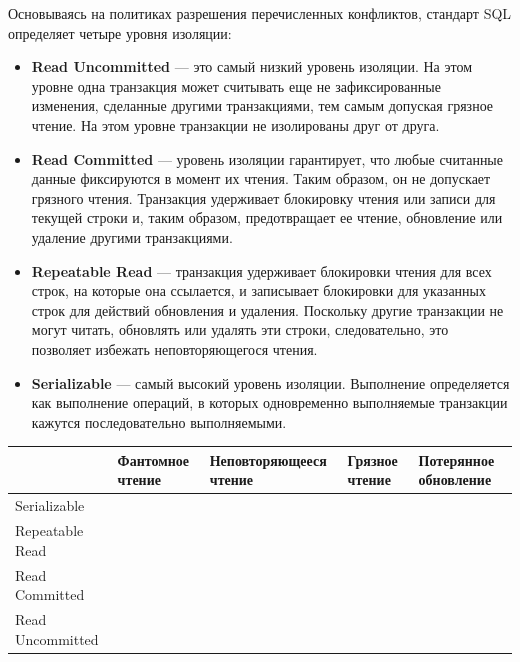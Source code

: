 Основываясь на политиках разрешения перечисленных конфликтов, стандарт SQL определяет четыре уровня изоляции:
\begin{itemize}
\item \textbf{Read Uncommitted} — это самый низкий уровень изоляции. На этом уровне одна транзакция может считывать еще не зафиксированные изменения, сделанные другими транзакциями, тем самым допуская грязное чтение. На этом уровне транзакции не изолированы друг от друга.
\item \textbf{Read Committed} — уровень изоляции гарантирует, что любые считанные данные фиксируются в момент их чтения. Таким образом, он не допускает грязного чтения. Транзакция удерживает блокировку чтения или записи для текущей строки и, таким образом, предотвращает ее чтение, обновление или удаление другими транзакциями.
\item \textbf{Repeatable Read} — транзакция удерживает блокировки чтения для всех строк, на которые она ссылается, и записывает блокировки для указанных строк для действий обновления и удаления. Поскольку другие транзакции не могут читать, обновлять или удалять эти строки, следовательно, это позволяет избежать неповторяющегося чтения.
\item \textbf{Serializable} — самый высокий уровень изоляции. Выполнение определяется как выполнение операций, в которых одновременно выполняемые транзакции кажутся последовательно выполняемыми\autocite{BeginningSQL}.
\end{itemize}

\begin{table}
\begin{tabular}{l|l|l|l|l}
                 & Фантомное чтение         & Неповторяющееся чтение   & Грязное чтение           & Потерянное обновление    \\ \hline
Serializable     & \cellcolor[HTML]{32CB00} & \cellcolor[HTML]{32CB00} & \cellcolor[HTML]{32CB00} & \cellcolor[HTML]{32CB00} \\ \hline
Repeatable Read  & \cellcolor[HTML]{FE0000} & \cellcolor[HTML]{32CB00} & \cellcolor[HTML]{32CB00} & \cellcolor[HTML]{32CB00} \\ \hline
Read Committed   & \cellcolor[HTML]{FE0000} & \cellcolor[HTML]{FE0000} & \cellcolor[HTML]{32CB00} & \cellcolor[HTML]{32CB00} \\ \hline
Read Uncommitted & \cellcolor[HTML]{FE0000} & \cellcolor[HTML]{FE0000} & \cellcolor[HTML]{FE0000} & \cellcolor[HTML]{32CB00} \\ \hline
\end{tabular}
\end{table}


